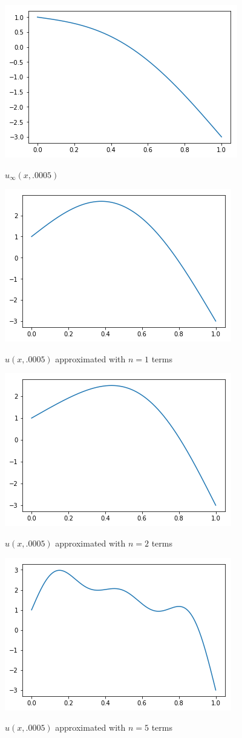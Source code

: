 \documentclass[12pt]{article}
\begin{document}
	
\begin{figure}[H]
	\caption{$u_\infty(x,.0005)$}
	\includegraphics[width=.5\textwidth]{tk01_figure_3_cross0}
	\label{cross0}
	\centering
\end{figure}
\begin{figure}[H]
	\caption{$u(x,.0005)$ approximated with $n=1$ terms}
	\includegraphics[width=.5\textwidth]{tk01_figure_4_cross1}
	\label{fig2}
	\centering
\end{figure}
\begin{figure}[H]
	\caption{$u(x,.0005)$ approximated with $n=2$ terms}
	\includegraphics[width=.5\textwidth]{tk01_figure_5_cross2}
	\label{fig2}
	\centering
\end{figure}
\begin{figure}[H]
	\caption{$u(x,.0005)$ approximated with $n=5$ terms}
	\includegraphics[width=.5\textwidth]{tk01_figure_6_cross5}
	\label{fig2}
	\centering
\end{figure}
\end{document}
